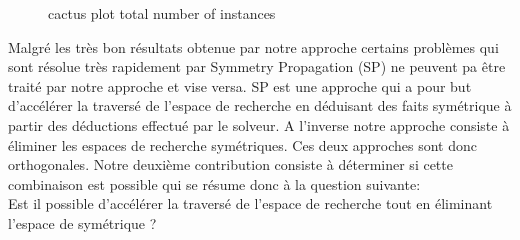 \begin{figure}[!htbp]
	\centering
	\qquad
	\caption{cactus plot  total number of instances}%
	\label{fig:frcactus}%
\end{figure}



Malgré les très bon résultats obtenue par notre approche certains problèmes qui sont résolue très 
rapidement par Symmetry Propagation (SP) ne peuvent pa être traité par notre approche et vise versa.
SP est une approche qui a pour but d'accélérer la traversé de l'espace de recherche en déduisant des faits symétrique 
à partir des déductions effectué par le solveur. A l'inverse notre approche consiste à éliminer les espaces de recherche 
symétriques. Ces deux approches sont donc orthogonales.
Notre deuxième contribution consiste à déterminer si cette combinaison est possible qui se résume donc à la question suivante:\\
Est il possible d'accélérer la traversé de l'espace de recherche tout en éliminant l'espace de symétrique ?

